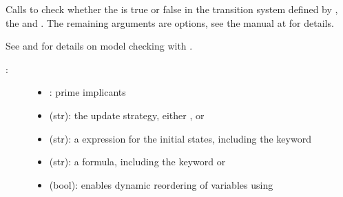 \documentclass[letterpaper,10pt,english]{sphinxmanual}
\begin{document}
\begin{fulllineitems}
\label{\detokenize{ModelChecking:PyBoolNet.ModelChecking.check_primes}}
Calls {\hyperref[\detokenize{Installation:installation-nusmv}]{}} to check whether the  is true or false in the transition system defined by ,
the  and .
The remaining arguments are {\hyperref[\detokenize{Installation:installation-nusmv}]{}} options, see the manual at  for details.

See {\hyperref[\detokenize{ModelChecking:primes2smv}]{}} and {\hyperref[\detokenize{Manual:sec-model-checking}]{}} for details on model checking with .
\begin{description}
\item[{:}] \leavevmode\begin{itemize}
\item {} 
: prime implicants

\item {} 
 (str): the update strategy, either ,  or 

\item {} 
 (str): a {\hyperref[\detokenize{Installation:installation-nusmv}]{}} expression for the initial states, including the keyword 

\item {} 
 (str): a {\hyperref[\detokenize{Installation:installation-nusmv}]{}} formula, including the keyword  or 

\item {} 
 (bool): enables dynamic reordering of variables using 


\end{itemize}
\end{description}
\end{fulllineitems}
\end{document}
